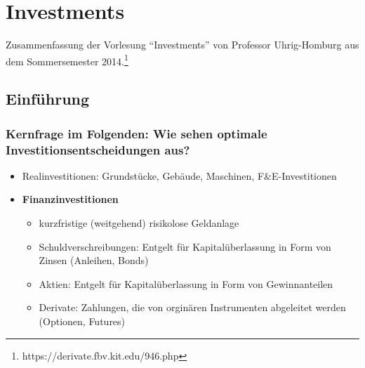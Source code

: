 \chapter{Investments}

Zusammenfassung der Vorlesung "`Investments"' von Professor Uhrig-Homburg aus dem Sommersemester 2014.\footnote{https://derivate.fbv.kit.edu/946.php}

\section{Einführung}

\subsection{Kernfrage im Folgenden: Wie sehen optimale Investitionsentscheidungen aus?}
\begin{itemize}
	\item Realinvestitionen: Grundstücke, Gebäude, Maschinen, F\&E-Investitionen
	\item \textbf{Finanzinvestitionen}
	\begin{itemize}
		\item kurzfristige (weitgehend) risikolose Geldanlage
		\item Schuldverschreibungen: Entgelt für Kapitalüberlassung in Form von Zinsen (Anleihen, Bonds)
		\item Aktien: Entgelt für Kapitalüberlassung in Form von Gewinnanteilen
		\item Derivate: Zahlungen, die von orginären Instrumenten abgeleitet werden (Optionen, Futures)
	\end{itemize}
\end{itemize}


